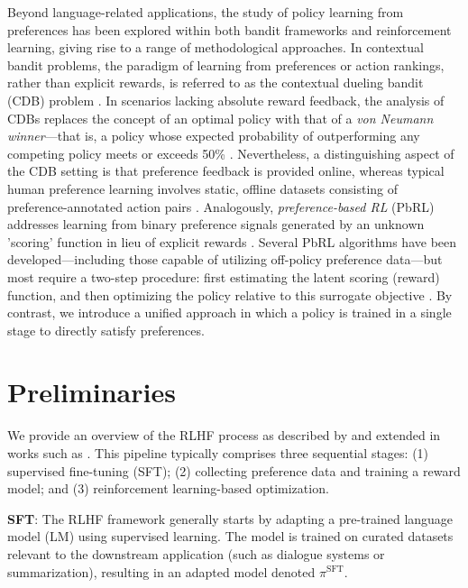 Beyond language-related applications, the study of policy learning from preferences has been explored within both bandit frameworks and reinforcement learning, giving rise to a range of methodological approaches. In contextual bandit problems, the paradigm of learning from preferences or action rankings, rather than explicit rewards, is referred to as the contextual dueling bandit (CDB) problem \citep{yue2012karmed, dudik2015contextual}. In scenarios lacking absolute reward feedback, the analysis of CDBs replaces the concept of an optimal policy with that of a \textit{von Neumann winner}—that is, a policy whose expected probability of outperforming any competing policy meets or exceeds 50\% \citep{dudik2015contextual}. Nevertheless, a distinguishing aspect of the CDB setting is that preference feedback is provided online, whereas typical human preference learning involves static, offline datasets consisting of preference-annotated action pairs \citep{yan2022human}. Analogously, \textit{preference-based RL} (PbRL) addresses learning from binary preference signals generated by an unknown 'scoring' function in lieu of explicit rewards \citep{BusaFekete2014, ruiz2023dueling}. Several PbRL algorithms have been developed—including those capable of utilizing off-policy preference data—but most require a two-step procedure: first estimating the latent scoring (reward) function, and then optimizing the policy relative to this surrogate objective \citep{jain2013learning, BusaFekete2014, christiano2017deep, sadigh2017active, kupcsik2018learning}. By contrast, we introduce a unified approach in which a policy is trained in a single stage to directly satisfy preferences.

\section{Preliminaries}\label{section:prelims}

We provide an overview of the RLHF process as described by \citeauthor{ziegler2020finetuning} and extended in works such as \citep{stiennon2022learning, bai2022training, ouyang2022training}. This pipeline typically comprises three sequential stages: (1) supervised fine-tuning (SFT); (2) collecting preference data and training a reward model; and (3) reinforcement learning-based optimization.

\textbf{SFT}: The RLHF framework generally starts by adapting a pre-trained language model (LM) using supervised learning. The model is trained on curated datasets relevant to the downstream application (such as dialogue systems or summarization), resulting in an adapted model denoted $\pi^\text{SFT}$.

